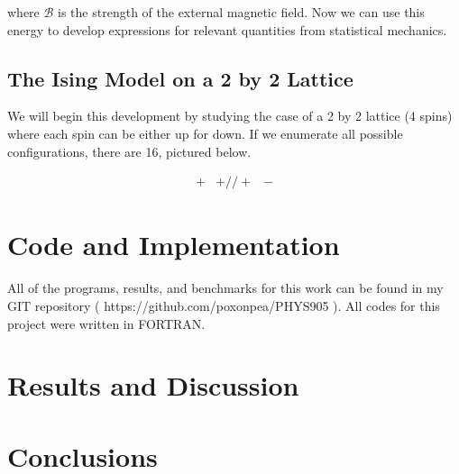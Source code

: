 \documentclass[%
oneside,                 %
final,                   %
10pt]{article}
\begin{document}
where $\mathcal{B}$ is the strength of the external magnetic field.  Now we can use this energy to develop expressions for relevant quantities from statistical mechanics.

\subsection{The Ising Model on a 2 by 2 Lattice}

We will begin this development by studying the case of a 2 by 2 lattice (4 spins) where each spin can be either up for down.  If we enumerate all possible configurations, there are 16, pictured below.

\begin{equation*}
\begin{matrix} +&+ // +&- \end{matrix}
\end{equation*}

\section{Code and Implementation}

All of the programs, results, and benchmarks for this work can be found in my GIT repository ( https://github.com/poxonpea/PHYS905 ).  All codes for this project were written in FORTRAN.

\section{Results and Discussion}


\section{Conclusions}


\begin{comment}

\begin{figure}[H]\label{fig:compzoom}
  \centering
    \texttt{[image: compzoom.eps]}
    \caption{A zoomed in view of the convergence to the exact solution}
\end{figure}

\begin{center} 
\begin{tabular}{ |c|c|c|c| }
\hline
Size of Matrix ($10^n$) & General & Tailored & LU \\
\hline
1& 3.00 E -6 & 3.00 E -6 & 2.40 E -5\\ 
2 & 4.00 E -6 & 4.00 E -6 & 1.71 E -3 \\ 
3 & 3.90 E -5 & 1.90 E -5 & 1.93\\ 
4 & 3.79 E -4 & 2.09 E -4 & N/A\\ 
5 & 3.38 E -3 & 1.51 E -3  & N/A\\ 
6 & 2.87 E -2 & 1.53 E -2 & N/A\\ 
7 & 3.16 E -1 & 1.73 E -1& N/A\\ 
\hline
\end{tabular}
\label{table:test}
\end{center}

\end{comment}
\end{document}
